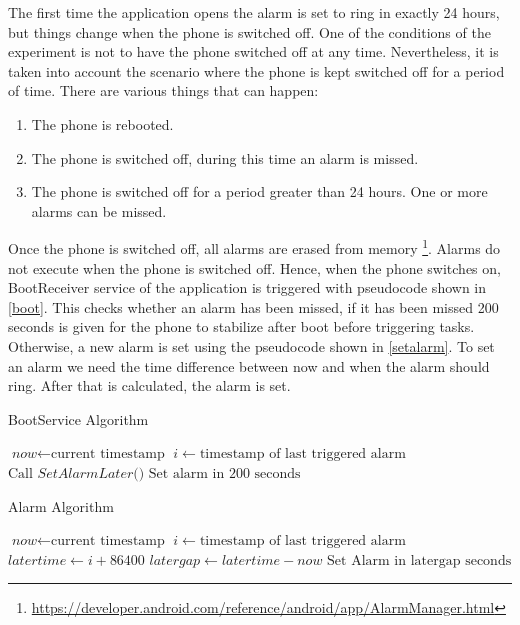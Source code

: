 The first time the application opens the alarm is set to ring in exactly 24 hours, but things change when the phone is switched off.
One of the conditions of the experiment is not to have the phone switched off at any time. Nevertheless, it is taken into account the scenario where
the phone is kept switched off for a period of time. There are various things that can happen:

\begin{enumerate}
	\item The phone is rebooted.
	\item The phone is switched off, during this time an alarm is missed.
    \item The phone is switched off for a period greater than 24 hours. One or more alarms can be missed.
\end{enumerate}

Once the phone is switched off, all alarms are erased from memory \footnote{\url{https://developer.android.com/reference/android/app/AlarmManager.html}}. Alarms do not execute when the phone is switched off. Hence, when the phone switches on,
BootReceiver service of the application is triggered with pseudocode shown in \ref{boot}. This checks whether an alarm has been missed, if it has been missed 200 seconds is given for the phone to stabilize after boot before triggering tasks. Otherwise, a new alarm is set using the pseudocode shown in \ref{setalarm}. To set an alarm we need the time difference between now and when the alarm should ring. After that is calculated, the alarm is set.

\begin{algorithm}
\caption{BootService Algorithm}\label{boot}
\begin{algorithmic}[1]
\State $\textit{now} \gets \text{current timestamp}$
\State $i \gets \text{timestamp of last triggered alarm}$
  \State $\text{Call }\textit{SetAlarmLater()}$
\Else
  \State $\text{Set alarm in 200 seconds}$
\EndIf
\EndProcedure
\end{algorithmic}
\end{algorithm}


\begin{algorithm}
\caption{Alarm Algorithm}\label{setalarm}
\begin{algorithmic}[1]
\State $\textit{now} \gets \text{current timestamp}$
\State $i \gets \text{timestamp of last triggered alarm}$
\State $\textit{latertime} \gets \textit{i}+\text{86400}$
\State $\textit{latergap} \gets \textit{latertime}-\textit{now}$
\State $\text{Set Alarm in latergap seconds}$
\EndProcedure
\end{algorithmic}
\end{algorithm}

